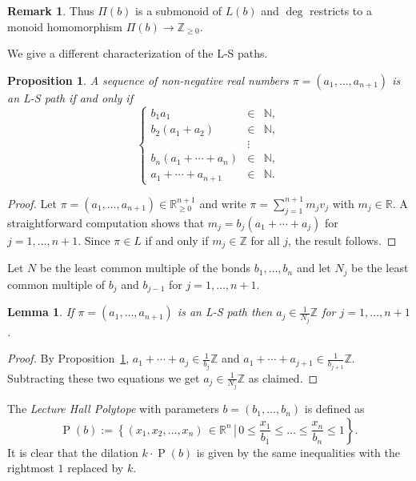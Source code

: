 \documentclass[12pt, a4paper]{amsart}   	%
\numberwithin{equation}{section}
\theoremstyle{plain}
\newtheorem{proposition}[theorem]{Proposition}
\newtheorem{lemma}[theorem]{Lemma}
\theoremstyle{definition}
\newtheorem{remark}[theorem]{Remark}
\DeclareMathOperator{\LH}{P}
\newcommand{\ZZ}{\mathbb{Z}}
\newcommand{\NN}{\mathbb{N}}
\newcommand{\RR}{\mathbb{R}}
\begin{document}
\begin{remark}
Thus $\Pi(b)$ is a submonoid of $L(b)$ and $\deg$ restricts to a monoid homomorphism $\Pi(b)\to\ZZ_{\ge 0}$.
\end{remark}

We give a different characterization of the L-S paths.
\begin{proposition}\label{prop:LS-characterization}
    A sequence of non-negative real numbers $\pi = (a_1,\dots,a_{n+1})$ is an L-S path if and only if
    \[
    \left\{
    \begin{array}{rcl}
        b_1 a_1 & \in &  \NN,\\
        b_2(a_1 + a_2) & \in &  \NN,\\
        & \vdots\\
        b_n(a_1 + \cdots + a_n) & \in &  \NN,\\
        a_1 + \cdots + a_{n+1} & \in &  \NN.
    \end{array}
    \right.
    \]
\end{proposition}
\begin{proof}
Let $\pi=(a_1,\dots,a_{n+1})\in\RR^{n+1}_{\ge0}$ and write $\pi = \sum_{j=1}^{n+1} m_j v_j$ with $m_j\in\RR$. A straightforward computation shows that $m_j = b_j(a_1 + \cdots + a_j)$ for $j = 1, \ldots, n+1$. Since $\pi\in L$ if and only if $m_j\in\ZZ$ for all $j$, the result follows.
\end{proof}

\smallskip

Let $N$ be the least common multiple of the bonds $b_1,\dots,b_n$ and let $N_j$ be the least common multiple of $b_j$ and $b_{j-1}$ for $j=1,\ldots,n+1$.
\begin{lemma}\label{lem:coordinates-in-frac}
    If $\pi = (a_1,\dots,a_{n+1})$ is an L-S path then $a_j\in \frac{1}{N_j}\ZZ$ for $j=1,\ldots,n+1$.
\end{lemma}
\begin{proof}
By Proposition~\ref{prop:LS-characterization}, $a_1 + \cdots + a_j\in\frac{1}{b_j}\ZZ$ and $a_1 + \cdots + a_{j+1}\in\frac{1}{b_{j+1}}\ZZ$. Subtracting these two equations we get $a_j\in\frac{1}{N_j}\ZZ$ as claimed.
\end{proof}

\smallskip

The \emph{Lecture Hall Polytope} with parameters $ b = (b_1,\ldots,b_n)$ is defined as
\[
\LH(b) := \left.\left\{
(x_1, x_2, \ldots, x_n)\,\in \mathbb{R}^n
\,\right|\,
0\leq\frac{x_1}{b_1}\leq\ldots\leq \frac{x_n}{b_n}\leq 1\right\}.
\]
It is clear that the dilation $k\cdot\LH(b)$ is given by the same inequalities with the rightmost $1$ replaced by $k$.
\end{document}

